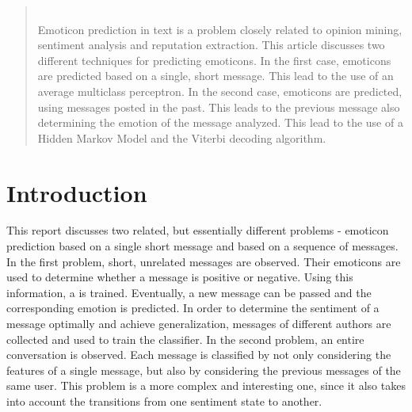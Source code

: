 \documentclass{article} %
\newcommand{\red}[1]{\textit{\color{red}{#1}}}
\begin{document}
\begin{abstract}
\red{Refine the abstract, maybe add most important results, a bit too much `lead`} \\
Emoticon prediction in text is a problem closely related to opinion mining, sentiment analysis and reputation extraction. This article discusses two different techniques for predicting emoticons. In the first case, emoticons are predicted based on a single, short message. This lead to the use of an average multiclass perceptron. In the second case, emoticons are predicted, using messages posted in the past. This leads to the previous message also determining the emotion of the message analyzed. This lead to the use of a Hidden Markov Model and the Viterbi decoding algorithm.
\end{abstract}

\section{Introduction}

\begin{comment}
Introduction (max 2 pages):
• Description of the problem area and the problem itself
• What is the research question / goal?
• Why is this an important / meaningful / interesting problem to consider?
• The very basic idea of the approach and why this is a reasonable approach for this problem?
\end{comment}


This report discusses two related, but essentially different problems - emoticon prediction based on a single short message and based on a sequence of messages. In the first problem, short, unrelated messages are observed. Their emoticons are used to determine whether a message is positive or negative. Using this information, a is trained. Eventually, a new message can be passed and the corresponding emotion is predicted. In order to determine the sentiment of a message optimally and achieve generalization, messages of different authors are collected and used to train the classifier. In the second problem, an entire conversation is observed. Each message is classified by not only considering the features of a single message, but also by considering the previous messages of the same user. This problem is a more complex and interesting one, since it also takes into account the transitions from one sentiment state to another. \\
\end{document}
